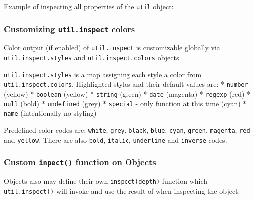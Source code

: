 Example of inspecting all properties of the \texttt{util} object:

\begin{Shaded}
\begin{Highlighting}[]
 \NormalTok{);}

\NormalTok{(}\NormalTok{: }\NormalTok{, }
\end{Highlighting}
\end{Shaded}

\subsubsection{Customizing \texttt{util.inspect} colors}

Color output (if enabled) of \texttt{util.inspect} is customizable
globally via \texttt{util.inspect.styles} and
\texttt{util.inspect.colors} objects.

\texttt{util.inspect.styles} is a map assigning each style a color from
\texttt{util.inspect.colors}. Highlighted styles and their default
values are: * \texttt{number} (yellow) * \texttt{boolean} (yellow) *
\texttt{string} (green) * \texttt{date} (magenta) * \texttt{regexp}
(red) * \texttt{null} (bold) * \texttt{undefined} (grey) *
\texttt{special} - only function at this time (cyan) * \texttt{name}
(intentionally no styling)

Predefined color codes are: \texttt{white}, \texttt{grey},
\texttt{black}, \texttt{blue}, \texttt{cyan}, \texttt{green},
\texttt{magenta}, \texttt{red} and \texttt{yellow}. There are also
\texttt{bold}, \texttt{italic}, \texttt{underline} and \texttt{inverse}
codes.

\subsubsection{Custom \texttt{inpect()} function on Objects}

Objects also may define their own \texttt{inspect(depth)} function which
\texttt{util.inspect()} will invoke and use the result of when
inspecting the object:

\begin{Shaded}
\begin{Highlighting}[]
 \NormalTok{);}

 \NormalTok{: } \NormalTok{\};}
 \NormalTok{= }
    \NormalTok{+ } \NormalTok{+ }\NormalTok{;}
\NormalTok{\};}

\end{Highlighting}
\end{Shaded}

